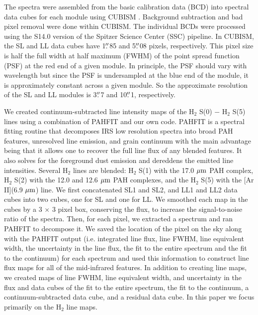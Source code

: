 \documentclass[manuscript]{aastex}
\begin{document}
The spectra were assembled from the basic calibration data (BCD) into
spectral data cubes for each module using CUBISM \citep{ken03, smi04, smi07b}.
Background subtraction and bad pixel removal were done within CUBISM.
The individual BCDs were processed using the S14.0 version of
the Spitzer Science Center (SSC) pipeline.  In CUBISM, the SL and LL
data cubes have 1$\mbox{$.\!\!^{\prime\prime}$}$85 and 5$\mbox{$.\!\!^{\prime\prime}$}$08 pixels,
respectively.  This pixel size is half the full width at half 
maximum (FWHM) of the point spread function (PSF)
at the red end of a given module.  In principle, the PSF should 
vary with wavelength but since the PSF is
undersampled at the blue end of the module, it is approximately
constant across a given module.  So the approximate resolution of the
SL and LL modules is 3$\mbox{$.\!\!^{\prime\prime}$}$7 and 10$\mbox{$.\!\!^{\prime\prime}$}$1, respectively.

We created continuum-subtracted line intensity maps of the $\mathrm{H_2}$
S(0) $-$ $\mathrm{H_2}$ S(5) lines using a combination of PAHFIT
\citep{smi07} and our own code.  PAHFIT is a spectral fitting routine
that decomposes IRS low resolution spectra into broad 
PAH features, unresolved line emission, and grain continuum with the main advantage
being that it allows one to recover the full line flux of any blended
features.  It also solves for the foreground dust emission and 
dereddens the emitted line intensities.  
Several $\mathrm{H_2}$ lines are blended:
$\mathrm{H_2}$ S(1) with the 17.0 $\mbox{$\mu$m}$ PAH complex,
$\mathrm{H_2}$ S(2) with the 12.0 and 12.6 $\mbox{$\mu$m}$ PAH complexes, and the
$\mathrm{H_2}$ S(5) with the [Ar II](6.9 $\mbox{$\mu$m}$) line.  We first
concatenated SL1 and SL2, and LL1 and LL2 data cubes into two cubes,
one for SL and one for LL.  We smoothed each map in the cubes by a 3
$\times$ 3 pixel box, conserving the flux, to increase the
signal-to-noise ratio of the spectra.  Then, for each pixel, we
extracted a spectrum and ran PAHFIT to decompose it.  We saved the
location of the pixel on the sky along with the PAHFIT output 
(i.e. integrated line flux, line FWHM, line equivalent width, the 
uncertainty in the line flux, the fit to the entire spectrum and 
the fit to the continuum) for each spectrum and used this 
information to construct line flux maps for all of the mid-infrared 
features.  In addition to creating line maps, we created maps 
of line FWHM, line equivalent width, and uncertainty in the 
flux and data cubes of the fit to the entire spectrum, the fit to 
the continuum, a continuum-subtracted data cube, and a 
residual data cube.  In this paper we focus primarily on the 
H$_2$ line maps.
\end{document}
